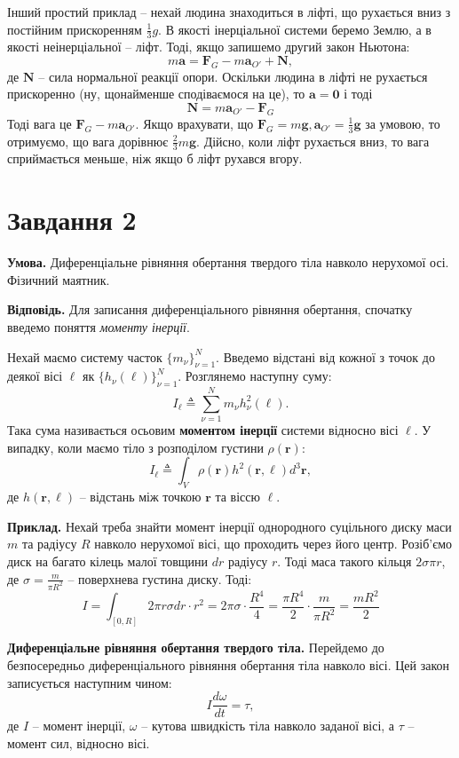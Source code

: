 \documentclass[14pt]{extarticle}
\begin{document}
Інший простий приклад -- нехай людина знаходиться в ліфті, що рухається вниз з постійним прискоренням $\frac{1}{3}g$. В якості інерціальної системи беремо Землю, а в якості неінерціальної -- ліфт. Тоді, якщо запишемо другий закон Ньютона:
\[
m\mathbf{a} = \mathbf{F}_G - m\mathbf{a}_{O'} + \mathbf{N},
\]
де $\mathbf{N}$ -- сила нормальної реакції опори. Оскільки людина в ліфті не рухається прискоренно (ну, щонайменше сподіваємося на це), то $\mathbf{a}=\boldsymbol{0}$ і тоді
\[
\mathbf{N} = m\mathbf{a}_{O'} - \mathbf{F}_G
\]
Тоді вага це $\mathbf{F}_G-m\mathbf{a}_{O'}$. Якщо врахувати, що $\mathbf{F}_G=m\mathbf{g},\mathbf{a}_{O'}=\frac{1}{3}\mathbf{g}$ за умовою, то отримуємо, що вага дорівнює $\frac{2}{3}m\mathbf{g}$. Дійсно, коли ліфт рухається вниз, то вага сприймається меньше, ніж якщо б ліфт рухався вгору.

\pagebreak

\section*{Завдання 2} 

\textbf{Умова.} Диференціальне рівняння обертання твердого тіла навколо нерухомої осі. Фізичний маятник.

\textbf{Відповідь.} Для записання диференціального рівняння обертання, спочатку введемо поняття \textit{моменту інерції}.

Нехай маємо систему часток $\{m_{\nu}\}_{\nu=1}^N$. Введемо відстані від кожної з точок до деякої вісі $\ell$ як $\{h_{\nu}(\ell)\}_{\nu=1}^N$. Розглянемо наступну суму:
\[
I_{\ell} \triangleq \sum_{\nu=1}^N m_{\nu}h_{\nu}^2(\ell).
\]
Така сума називається осьовим \textbf{моментом інерції} системи відносно вісі $\ell$. У випадку, коли маємо тіло з розподілом густини $\rho(\mathbf{r})$:
\[
I_{\ell} \triangleq \int_V \rho(\mathbf{r})h^2(\mathbf{r},\ell)d^3\mathbf{r},
\]
де $h(\mathbf{r},\ell)$ -- відстань між точкою $\mathbf{r}$ та віссю $\ell$. 

\textbf{Приклад.} Нехай треба знайти момент інерції однородного суцільного диску маси $m$ та радіусу $R$ навколо нерухомої вісі, що проходить через його центр. Розіб'ємо диск на багато кілець малої товщини $dr$ радіусу $r$. Тоді маса такого кільця $2\sigma\pi r$, де $\sigma=\frac{m}{\pi R^2}$ -- поверхнева густина диску. Тоді:
\[
I = \int_{[0,R]} 2\pi r\sigma dr \cdot r^2 =2\pi\sigma \cdot \frac{R^4}{4} = \frac{\pi R^4}{2} \cdot \frac{m}{\pi R^2} = \frac{mR^2}{2}
\]

\textbf{Диференціальне рівняння обертання твердого тіла.} Перейдемо до безпосередньо диференціального рівняння обертання тіла навколо вісі. Цей закон записується наступним чином:
\[
I\frac{d\omega}{dt} = \tau,
\]
де $I$ -- момент інерції, $\omega$ -- кутова швидкість тіла навколо заданої вісі, а $\tau$ -- момент сил, відносно вісі. 
\end{document}
